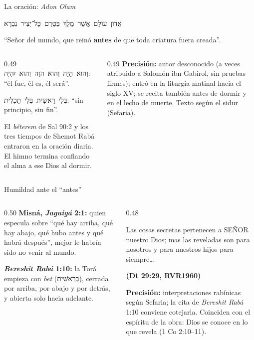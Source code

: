 \documentclass[hyperref={bookmarks=false},aspectratio=169]{beamer}
\newcommand{\heb}[1]{\mbox{\foreignlanguage{hebrew}{#1}}}
\newcommand{\SENOR}{S{\fontsize{0.78em}{1em}\selectfont EÑOR}}
\newcommand{\fuente}[1]{\par\hfill{\upshape\bfseries\footnotesize\textcolor{azul}{#1}}}
\newcommand{\destacar}[1]{\textbf{\textcolor{azul}{#1}}}
\newcommand{\precision}[1]{{\footnotesize\color{gris}\textbf{Precisión:} #1}}
\begin{document}
\begin{frame}{La oración: \emph{Adon Olam}}
\begin{center}\large\heb{אֲדוֹן עוֹלָם אֲשֶׁר מָלַךְ בְּטֶרֶם כָּל־יְצִיר נִבְרָא}\end{center}
\small ``Señor del mundo, que reinó \destacar{antes} de que toda criatura fuera creada''.\par\medskip
\begin{columns}[t,onlytextwidth]
\begin{column}{0.49\textwidth}\scriptsize
\heb{וְהוּא הָיָה וְהוּא הֹוֶה וְהוּא יִהְיֶה}: ``él fue, él es, él será''.\par
\heb{בְּלִי רֵאשִׁית בְּלִי תַכְלִית}: ``sin principio, sin fin''.\par\smallskip
El \emph{béterem} de Sal 90:2 y los tres tiempos de Shemot Rabá entraron en la oración diaria. El himno termina confiando el alma a ese Dios al dormir.
\end{column}
\begin{column}{0.49\textwidth}
\precision{autor desconocido (a veces atribuido a Salomón ibn Gabirol, sin pruebas firmes); entró en la liturgia matinal hacia el siglo XV; se recita también antes de dormir y en el lecho de muerte. Texto según el sidur (Sefaria).}
\end{column}
\end{columns}
\end{frame}

\begin{frame}{Humildad ante el ``antes''}
\begin{columns}[t,onlytextwidth]
\begin{column}{0.50\textwidth}\small
\textbf{Misná, \emph{Jaguigá} 2:1:} quien especula sobre ``qué hay arriba, qué hay abajo, qué hubo antes y qué habrá después'', mejor le habría sido no venir al mundo.\par\medskip
\textbf{\emph{Bereshit Rabá} 1:10:} la Torá empieza con \emph{bet} (\heb{בְּרֵאשִׁית}), cerrada por arriba, por abajo y por detrás, y abierta solo hacia adelante.
\end{column}
\begin{column}{0.48\textwidth}
\begin{cita}Las cosas secretas pertenecen a \SENOR{} nuestro Dios; mas las reveladas son para nosotros y para nuestros hijos para siempre\ldots\fuente{(Dt 29:29, RVR1960)}\end{cita}
\precision{interpretaciones rabínicas según Sefaria; la cita de \emph{Bereshit Rabá} 1:10 conviene cotejarla. Coinciden con el espíritu de la obra: Dios se conoce en lo que revela (1 Co 2:10--11).}
\end{column}
\end{columns}
\end{frame}
\end{document}
